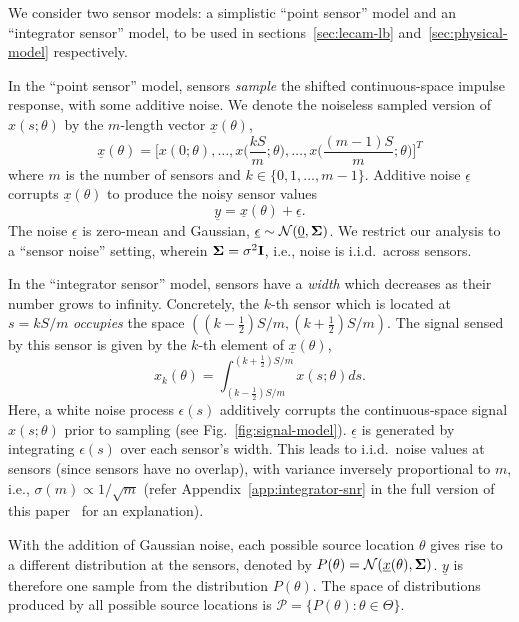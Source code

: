\documentclass[conference]{IEEEtran}
\providecommand{\v}{}
\renewcommand{\v}[1]{\underline{#1}}
\providecommand{\m}{}
\renewcommand{\m}[1]{{\bf #1}}
\begin{document}
We consider two sensor models: a simplistic ``point sensor'' model and an
``integrator sensor'' model, to be used in sections~\ref{sec:lecam-lb}
and~\ref{sec:physical-model} respectively.

In the ``point sensor'' model, sensors \emph{sample} the shifted
continuous-space impulse response, with some additive noise. We denote the
noiseless sampled version of $x(s; \theta)$ by the $m$-length vector $\v
x(\theta)$,
\begin{equation} \label{eq:sampled-signal}
	\v x(\theta) = \bigg[x(0; \theta), \ldots, x\Big(\frac{kS}{m}; \theta\Big), \ldots, x\Big(\frac{(m{-}1)S}{m}; \theta\Big)\bigg]^T
\end{equation}
where $m$ is the number of sensors and $k \in \{0, 1, \ldots, m-1\}$. Additive
noise $\v \epsilon$ corrupts $\v x(\theta)$ to produce the noisy sensor values
\begin{equation} \label{eq:sensor-obs}
	\v y = \v x(\theta) + \v \epsilon.
\end{equation}
The noise $\v \epsilon$ is zero-mean and Gaussian, $\v \epsilon \sim
\mathcal{N}(\v 0, \m \Sigma)$. We restrict our analysis to a ``sensor noise''
setting, wherein $\m\Sigma = \sigma^2 \m I$, i.e., noise is i.i.d.\ across
sensors.

In the ``integrator sensor'' model, sensors have a \emph{width} which decreases
as their number grows to infinity. Concretely, the \mbox{$k$-th} sensor which
is located at $s = kS/m$ \emph{occupies} the space $((k{-}\frac{1}{2})S/m,
(k{+}\frac{1}{2})S/m)$.  The signal sensed by this sensor is given by the
$k$-th element of $\v x(\theta)$,
\begin{equation} \label{eq:samples-int-model}
	x_k(\theta) = \int_{(k-\frac{1}{2})S/m}^{(k+\frac{1}{2})S/m} x(s;\theta) ds.
\end{equation}
Here, a white noise process $\epsilon(s)$ additively corrupts the
continuous-space signal $x(s;\theta)$ prior to sampling (see
Fig.~\ref{fig:signal-model}). $\v \epsilon$ is generated by integrating
$\epsilon(s)$ over each sensor's width. This leads to i.i.d.\ noise values at
sensors (since sensors have no overlap), with variance inversely proportional
to $m$, i.e., $\sigma(m) \propto 1/\sqrt{m}$ (refer
Appendix~\ref{app:integrator-snr} in the full version of this
paper~\cite{FullVersion} for an explanation).

With the addition of Gaussian noise, each possible source location $\theta$
gives rise to a different distribution at the sensors, denoted by $P(\theta) =
\mathcal{N}(\v x(\theta), \m \Sigma)$. $\v y$ is therefore one sample from the
distribution $P(\theta)$. The space of distributions produced by all possible
source locations is $\mathcal{P} = \{P(\theta) : \theta \in \Theta \}$.
\end{document}

